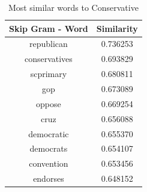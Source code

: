 \documentclass[12pt, authoryear]{elsarticle}
\begin{document}
\begin{center}
\begin{table}[H]
\begin{tabular}{ c c }
Skip Gram - Word   &  Similarity \\
 \hline
republican    & 0.736253 \\
conservatives    & 0.693829\\
scprimary &    0.680811\\
 gop   &  0.673089\\
oppose   &  0.669254\\
cruz  &   0.656088\\
democratic  &   0.655370\\
democrats   &  0.654107\\
 convention  &   0.653456\\
endorses  &   0.648152\\
 \hline
\end{tabular}
\caption{Most similar words to Conservative}
\label{table:8}
\end{table}
\end{center}
\end{document}
